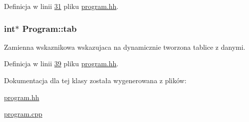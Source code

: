 Definicja w linii \hyperlink{program_8hh_source_l00031}{31} pliku \hyperlink{program_8hh_source}{program.\-hh}.

\hypertarget{class_program_ac72268c925315098b1632cc97d0f818a}{
\subsubsection[{tab}]{\setlength{\rightskip}{0pt plus 5cm}int$\ast$ Program\-::tab\hspace{0.3cm}{\ttfamily [protected]}}}\label{class_program_ac72268c925315098b1632cc97d0f818a}
Zamienna wskaznikowa wskazujaca na dynamicznie tworzona tablice z danymi. 

Definicja w linii \hyperlink{program_8hh_source_l00039}{39} pliku \hyperlink{program_8hh_source}{program.\-hh}.



Dokumentacja dla tej klasy została wygenerowana z plików\-:\begin{DoxyCompactItemize}
\item 
\hyperlink{program_8hh}{program.\-hh}\item 
\hyperlink{program_8cpp}{program.\-cpp}\end{DoxyCompactItemize}
